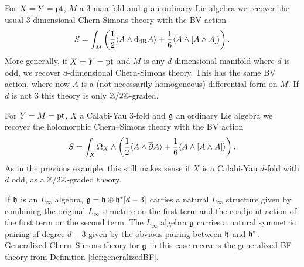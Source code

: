 \documentclass[10pt, oneside]{article}
\begin{document}
\begin{example}
For $X=Y=\operatorname{pt}$, $M$ a 3-manifold and $\mathfrak g$ an ordinary Lie algebra we recover the usual 3-dimensional Chern-Simons theory with the BV action
\[S = \int_M \left(\frac{1}{2}\langle A\wedge {\rm d}_{\mathrm{dR}} A\rangle + \frac{1}{6}\langle A\wedge [A\wedge A]\rangle\right).\]
More generally, if $X=Y=\operatorname{pt}$ and $M$ is any $d$-dimensional manifold where $d$ is odd, we recover $d$-dimensional Chern-Simons theory.  This has the same BV action, where now $A$ is a (not necessarily homogeneous) differential form on $M$.  If $d$ is not 3 this theory is only $\mathbb Z/2\mathbb Z$-graded.
\end{example}

\begin{example}
For $Y=M=\operatorname{pt}$, $X$ a Calabi-Yau 3-fold and $\mathfrak g$ an ordinary Lie algebra we recover the holomorphic Chern--Simons theory with the BV action
\[S = \int_X \Omega_X\wedge \left(\frac{1}{2}\langle A\wedge \overline{\partial} A\rangle + \frac{1}{6}\langle A\wedge [A\wedge A]\rangle\right).\]
As in the previous example, this still makes sense if $X$ is a Calabi-Yau $d$-fold with $d$ odd, as a $\mathbb Z/2\mathbb Z$-graded theory.
\end{example}

\begin{example}
If $\mathfrak h$ is an $L_\infty$ algebra, $\mathfrak g = \mathfrak h \oplus \mathfrak h^*[d-3]$ carries a natural $L_\infty$ structure given by combining the original $L_\infty$ structure on the first term and the coadjoint action of the first term on the second term. The $L_\infty$ algebra $\mathfrak g$ carries a natural symmetric pairing of degree $d-3$ given by the obvious pairing between $\mathfrak h$ and $\mathfrak h^*$. Generalized Chern--Simons theory for $\mathfrak g$ in this case recovers the generalized BF theory from Definition \ref{def:generalizedBF}.
\label{ex:CSBF}
\end{example}
\end{document}
